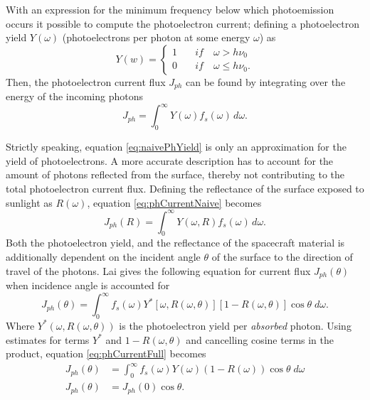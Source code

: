 With an expression for the minimum frequency below which photoemission occurs it possible to compute the photoelectron current; defining a photoelectron yield $Y(\omega)$  (photoelectrons per photon at some energy $\omega$) as
\begin{equation} \label{eq:naivePhYield}
    Y(w) = 
    \begin{cases}
        1 \quad& if \quad \omega > h \nu_0 \\
        0 \quad& if \quad \omega \leqslant h \nu_0.
    \end{cases}
\end{equation}
Then, the photoelectron current flux $J_{ph}$ can be found by integrating over the energy of the incoming photons \parencite[Ch. 7]{Chen2018}
\begin{equation}\label{eq:phCurrentNaive}
    J_{ph} = \int^\infty_0 Y(\omega) f_s(\omega) \, d\omega.
\end{equation}

Strictly speaking, equation \eqref{eq:naivePhYield} is only an approximation for the yield of photoelectrons. A more accurate description has to account for the amount of photons reflected from the surface, thereby not contributing to the total photoelectron current flux. Defining the reflectance of the surface exposed to sunlight as $R(\omega)$, equation \eqref{eq:phCurrentNaive} becomes
\begin{equation}\label{eq:phCurrentR}
    J_{ph}(R) = \int^\infty_0 Y(\omega, R) f_s(\omega) \, d\omega.
\end{equation}
Both the photoelectron yield, and the reflectance of the spacecraft material is additionally dependent on the incident angle $\theta$ of the surface to the direction of travel of the photons. Lai gives the following equation for current flux $J_{ph}(\theta)$ when incidence angle is accounted for
\begin{equation}\label{eq:phCurrentFull}
    J_{ph}(\theta) = \int^\infty_0 f_s(\omega) Y^{*}[\omega, R(\omega, \theta)][1 - R(\omega, \theta)] \cos \theta \; d\omega.
\end{equation}
Where $Y^{*}(\omega, R(\omega, \theta))$ is the photoelectron yield per \emph{absorbed} photon. Using estimates for terms $Y^{*}$ and $1 - R(\omega, \theta)$ and cancelling cosine terms in the product, equation \eqref{eq:phCurrentFull} becomes
\begin{subequations}
    \begin{align}
        J_{ph}(\theta) &= \int^\infty_0 f_s(\omega) Y(\omega)(1 - R(\omega)) \cos \theta \; d\omega \\
        J_{ph}(\theta) &= J_{ph}(0) \cos \theta.
    \end{align}
\end{subequations}

